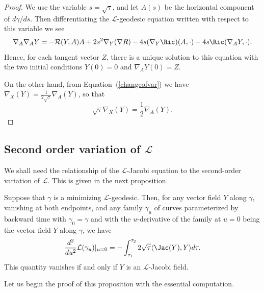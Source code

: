 \begin{proof}
We use the variable $s=\sqrt{\tau}$, and let $A(s)$ be the
horizontal component of $d\gamma/ds$. Then differentiating the
${\mathcal L}$-geodesic equation written with respect to this
variable we see
$$\nabla_A\nabla_AY=-{\mathcal R}(Y,A)A+2s^2\nabla_Y(\nabla R)-4s(\nabla_Y\Ric)(A,\cdot)
-4s\Ric(\nabla_AY,\cdot).$$ Hence, for each tangent vector $Z$,
there is a unique solution to this equation with the two initial
conditions $Y(0)=0$ and $\nabla_AY(0)=Z$.

On the other hand, from Equation~(\ref{changeofvar}) we have
$\nabla_X(Y)=\frac{1}{2\sqrt{\tau}}\nabla_A(Y)$, so that
$$\sqrt{\tau}\nabla_X(Y)=\frac{1}{2}\nabla_A(Y).$$
\end{proof}


\subsection{Second order variation of ${\mathcal
L}$} We shall need the relationship of the ${\mathcal L}$-Jacobi
equation to the second-order variation of ${\mathcal L}$. This is
given in the next proposition.




\begin{proposition}\label{prop:l-length-second-variation}
\label{2ndvarj}
Suppose that $\gamma$ is a minimizing ${\mathcal L}$-geodesic. Then,
for any vector field $Y$ along $\gamma$, vanishing at both
endpoints, and any family $\gamma_u$ of curves parameterized by
backward time with $\gamma_0=\gamma$ and with the $u$-derivative of
the family at $u=0$ being the vector field $Y$ along $\gamma$, we
have
$$\frac{d^2}{du^2}{\mathcal L}(\gamma_u)|_{u=0}=-\int_{\tau_1}^{\tau_2}2\sqrt{\tau}
\langle \Jac(Y),Y\rangle d\tau.$$ This quantity vanishes if and
only if $Y$ is an ${\mathcal L}$-Jacobi field.
\end{proposition}


Let us begin the proof of this proposition with the essential computation.


